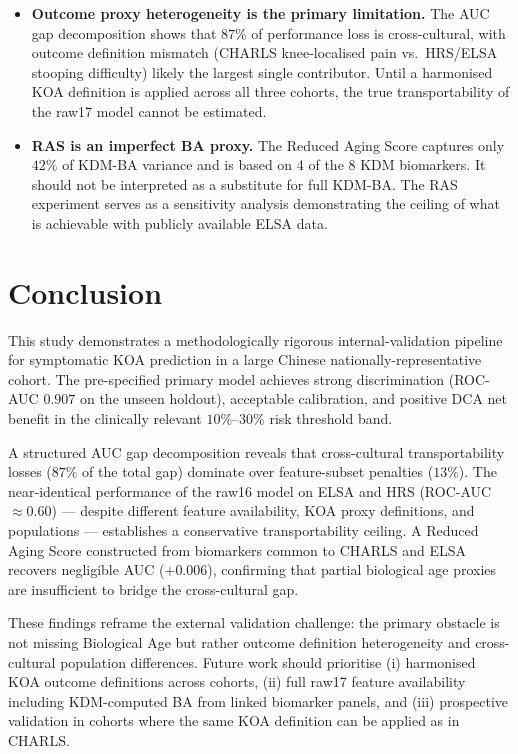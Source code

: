 \documentclass[11pt,a4paper]{article}
\begin{document}
\begin{itemize}
\item \textbf{Outcome proxy heterogeneity is the primary limitation.} The AUC gap
      decomposition shows that $87\%$ of performance loss is cross-cultural, with
      outcome definition mismatch (CHARLS knee-localised pain vs.\ HRS/ELSA stooping
      difficulty) likely the largest single contributor. Until a harmonised KOA
      definition is applied across all three cohorts, the true transportability of
      the raw17 model cannot be estimated.
\item \textbf{RAS is an imperfect BA proxy.} The Reduced Aging Score captures only
      $42\%$ of KDM-BA variance and is based on 4 of the 8 KDM biomarkers. It should
      not be interpreted as a substitute for full KDM-BA. The RAS experiment serves
      as a sensitivity analysis demonstrating the ceiling of what is achievable with
      publicly available ELSA data.
\end{itemize}

\section{Conclusion}

This study demonstrates a methodologically rigorous internal-validation pipeline for
symptomatic KOA prediction in a large Chinese nationally-representative cohort. The
pre-specified primary model achieves strong discrimination (ROC-AUC $0.907$ on the
unseen holdout), acceptable calibration, and positive DCA net benefit in the
clinically relevant $10\%$--$30\%$ risk threshold band.

A structured AUC gap decomposition reveals that cross-cultural transportability
losses ($87\%$ of the total gap) dominate over feature-subset penalties ($13\%$).
The near-identical performance of the raw16 model on ELSA and HRS (ROC-AUC
$\approx 0.60$) — despite different feature availability, KOA proxy definitions, and
populations — establishes a conservative transportability ceiling. A Reduced Aging
Score constructed from biomarkers common to CHARLS and ELSA recovers negligible AUC
($+0.006$), confirming that partial biological age proxies are insufficient to bridge
the cross-cultural gap.

These findings reframe the external validation challenge: the primary obstacle is not
missing Biological Age but rather outcome definition heterogeneity and cross-cultural
population differences. Future work should prioritise (i) harmonised KOA outcome
definitions across cohorts, (ii) full raw17 feature availability including
KDM-computed BA from linked biomarker panels, and (iii) prospective validation in
cohorts where the same KOA definition can be applied as in CHARLS.
\end{document}
